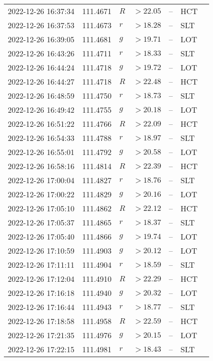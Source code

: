 \documentclass{nature_plusfigure}
\begin{document}
\begin{supplement}
\begin{center}
\begin{longtable}{lllllll}
2022-12-26 16:37:34 & 111.4671 & $R$ & $>22.05$ & -- & HCT &  \\ 
2022-12-26 16:37:53 & 111.4673 & $r$ & $>18.28$ & -- & SLT &  \\ 
2022-12-26 16:39:05 & 111.4681 & $g$ & $>19.71$ & -- & LOT &  \\ 
2022-12-26 16:43:26 & 111.4711 & $r$ & $>18.33$ & -- & SLT &  \\ 
2022-12-26 16:44:24 & 111.4718 & $g$ & $>19.72$ & -- & LOT &  \\ 
2022-12-26 16:44:27 & 111.4718 & $R$ & $>22.48$ & -- & HCT &  \\ 
2022-12-26 16:48:59 & 111.4750 & $r$ & $>18.73$ & -- & SLT &  \\ 
2022-12-26 16:49:42 & 111.4755 & $g$ & $>20.18$ & -- & LOT &  \\ 
2022-12-26 16:51:22 & 111.4766 & $R$ & $>22.09$ & -- & HCT &  \\ 
2022-12-26 16:54:33 & 111.4788 & $r$ & $>18.97$ & -- & SLT &  \\ 
2022-12-26 16:55:01 & 111.4792 & $g$ & $>20.58$ & -- & LOT &  \\ 
2022-12-26 16:58:16 & 111.4814 & $R$ & $>22.39$ & -- & HCT &  \\ 
2022-12-26 17:00:04 & 111.4827 & $r$ & $>18.76$ & -- & SLT &  \\ 
2022-12-26 17:00:22 & 111.4829 & $g$ & $>20.16$ & -- & LOT &  \\ 
2022-12-26 17:05:10 & 111.4862 & $R$ & $>22.12$ & -- & HCT &  \\ 
2022-12-26 17:05:37 & 111.4865 & $r$ & $>18.37$ & -- & SLT &  \\ 
2022-12-26 17:05:40 & 111.4866 & $g$ & $>19.74$ & -- & LOT &  \\ 
2022-12-26 17:10:59 & 111.4903 & $g$ & $>20.12$ & -- & LOT &  \\ 
2022-12-26 17:11:11 & 111.4904 & $r$ & $>18.59$ & -- & SLT &  \\ 
2022-12-26 17:12:04 & 111.4910 & $R$ & $>22.29$ & -- & HCT &  \\ 
2022-12-26 17:16:18 & 111.4940 & $g$ & $>20.32$ & -- & LOT &  \\ 
2022-12-26 17:16:44 & 111.4943 & $r$ & $>18.77$ & -- & SLT &  \\ 
2022-12-26 17:18:58 & 111.4958 & $R$ & $>22.59$ & -- & HCT &  \\ 
2022-12-26 17:21:35 & 111.4976 & $g$ & $>20.15$ & -- & LOT &  \\ 
2022-12-26 17:22:15 & 111.4981 & $r$ & $>18.43$ & -- & SLT &  \\ 

\end{longtable}
\end{center}
\end{supplement}
\end{document}
